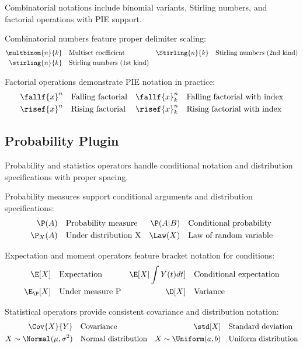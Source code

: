 \documentclass{article}
\begin{document}
Combinatorial notations include binomial variants, Stirling numbers, and factorial operations with PIE support.

Combinatorial numbers feature proper delimiter scaling:
\begin{align*}
\multbinom{n}{k} &\quad\text{Multiset coefficient} &
\Stirling{n}{k} &\quad\text{Stirling numbers (2nd kind)} \\
\stirling{n}{k} &\quad\text{Stirling numbers (1st kind)} &
\end{align*}

Factorial operations demonstrate PIE notation in practice:
\begin{align*}
\fallf{x}^{n} &\quad\text{Falling factorial} &
\fallf{x}_{k}^{n} &\quad\text{Falling factorial with index} \\
\risef{x}^{n} &\quad\text{Rising factorial} &
\risef{x}^{n}_{k} &\quad\text{Rising factorial with index}
\end{align*}

\subsection{Probability Plugin}

Probability and statistics operators handle conditional notation and distribution specifications with proper spacing.

Probability measures support conditional arguments and distribution specifications:
\begin{align*}
\P(A) &\quad\text{Probability measure} &
\P(A | B) &\quad\text{Conditional probability} \\
\P_{X}(A) &\quad\text{Under distribution X} &
\Law(X) &\quad\text{Law of random variable}
\end{align*}

Expectation and moment operators feature bracket notation for conditions:
\begin{align*}
\E[X] &\quad\text{Expectation} &
  \E[X | \int Y(t)dt] &\quad\text{Conditional expectation} \\
\E_{\P}[X] &\quad\text{Under measure P} &
\D[X] &\quad\text{Variance}
\end{align*}

Statistical operators provide consistent covariance and distribution notation:
\begin{align*}
\Cov{X}{Y} &\quad\text{Covariance} &
\std[X] &\quad\text{Standard deviation} \\
X \sim \Normal(\mu,\sigma^2) &\quad\text{Normal distribution} &
X \sim \Uniform(a,b) &\quad\text{Uniform distribution}
\end{align*}
\end{document}
